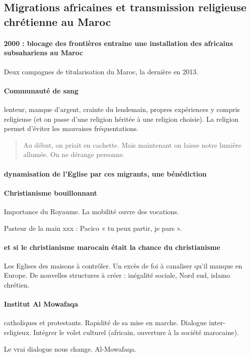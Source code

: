 \subsection{Migrations africaines et transmission religieuse chrétienne au Maroc}

\paragraph{2000 : blocage des frontières entraine une installation des africains subsahariens au Maroc} Deux campagnes de titularisation du Maroc, la dernière en 2013. 
\paragraph{Communauté de sang} lenteur, manque d’argent, crainte du lendemain, propres expériences y compris religieuse (et on passe d’une religion héritée à une religion choisie). 
La religion permet d’éviter les mauvaises fréquentations. 
\begin{quote}
Au début, on priait en cachette. Mais maintenant on laisse notre lumière allumée. On ne dérange personne. 
\end{quote}

\paragraph{dynamisation de l’Eglise par ces migrants, une bénédiction}
\paragraph{Christianisme bouillonnant} Importance du Royaume. La mobilité ouvre des vocations. 
\begin{Ex}
Pasteur de la main xxx : Pacico « tu peux partir, je pars ». 
\end{Ex}
\paragraph{et si le christianisme marocain était la chance du christianisme} Les Eglises des maisons à contrôler.  Un excès de foi à canaliser qu’il manque en Europe. De nouvelles structures à créer : inégalité sociale,  Nord sud, islamo chrétien. 

\paragraph{Institut Al Mowafaqa} catholiques et protestants. Rapidité de sa mise en marche.  Dialogue inter-religieux. Intégrer le volet culturel (africain, ouverture à la société marocaine).
\begin{Synthesis}
Le vrai dialogue nous change. Al-Mowafaqa. 
\end{Synthesis} 

